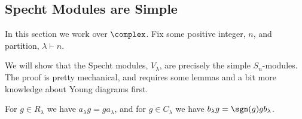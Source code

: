 \documentclass[fleqn]{NotesClass}
\newcommand{\partition}{\vdash}
\newcommand{\rowGroup}{R}
\newcommand{\columnGroup}{C}
\begin{document}
    \subsection{Specht Modules are Simple}
    In this section we work over \(\complex\).
    Fix some positive integer, \(n\), and partition, \(\lambda \partition n\).
    
    We will show that the Specht modules, \(V_\lambda\), are precisely the simple \(S_n\)-modules.
    The proof is pretty mechanical, and requires some lemmas and a bit more knowledge about Young diagrams first.
    
    \begin{lma}{}{}
        For \(g \in \rowGroup_\lambda\) we have \(a_\lambda g = g a_\lambda\), and for \(g \in \columnGroup_\lambda\) we have \(b_\lambda g = \sgn(g) g b_\lambda\).
    \end{lma}
    
\end{document}
